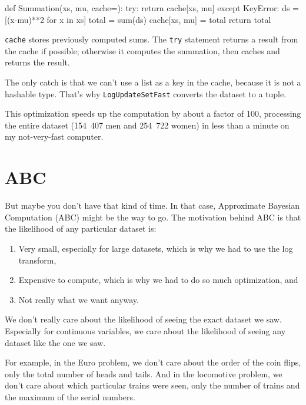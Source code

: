 \documentclass[12pt]{book}
\theoremstyle{exercise}
\begin{document}
\begin{code}
def Summation(xs, mu, cache={}):
    try:
        return cache[xs, mu]
    except KeyError:
        ds = [(x-mu)**2 for x in xs]
        total = sum(ds)
        cache[xs, mu] = total
        return total
\end{code}

{\tt cache} stores previously computed sums.  The {\tt try} statement
returns a result from the cache if possible; otherwise it computes
the summation, then caches and returns the result.

The only catch is that we can't use a list as a key in the cache, because
it is not a hashable type.  That's why {\tt LogUpdateSetFast} converts
the dataset to a tuple.

This optimization speeds up the computation by about a
factor of 100, processing the entire dataset (154~407 men and 254~722
women) in less than a minute on my not-very-fast computer.


\section{ABC}

But maybe you don't have that kind of time.  In that case, Approximate
Bayesian Computation (ABC) might be the way to go.  The motivation
behind ABC is that the likelihood of any particular dataset is:

\begin{enumerate}

\item Very small, especially for large datasets, which is why we had
to use the log transform,

\item Expensive to compute, which is why we had to do so much
optimization, and

\item Not really what we want anyway.

\end{enumerate}

We don't really care about the likelihood of seeing the exact dataset
we saw.  Especially for continuous variables, we care about the
likelihood of seeing any dataset like the one we saw.

For example, in the Euro problem, we don't care about the order of
the coin flips, only the total number of heads and tails.  And in
the locomotive problem, we don't care about which particular trains were
seen, only the number of trains and the maximum of the serial numbers.
\end{document}
